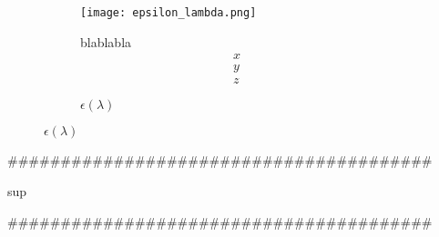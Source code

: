 \begin{figure}[H]
	\begin{subfigure}[t]{.5\textwidth}
		\texttt{[image: epsilon\_lambda.png]}\caption{$\epsilon(\lambda)$}
		blablabla
		\begin{equation}
		\begin{matrix}
		x\\
		y\\
		z
		\end{matrix}
		\end{equation}
	\end{subfigure}

\end{figure}
\#\#\#\#\#\#\#\#\#\#\#\#\#\#\#\#\#\#\#\#\#\#\#\#\#\#\#\#\#\#\#\#\#\#\#\#\#\#\#\#
\begin{center}sup\end{center}

\#\#\#\#\#\#\#\#\#\#\#\#\#\#\#\#\#\#\#\#\#\#\#\#\#\#\#\#\#\#\#\#\#\#\#\#\#\#\#\#\\